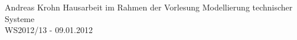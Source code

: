 
\date{\today}


{Andreas Krohn} %
{Hausarbeit im Rahmen der Vorlesung Modellierung technischer Systeme\\
WS2012/13 - 09.01.2012} %

% 

\tableofcontents %








